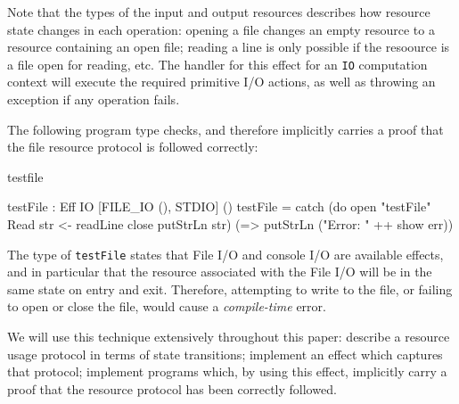 \noindent
Note that the types of the input and output resources describes how resource
state changes in each operation: opening a file changes an empty resource to
a resource containing an open file; reading a line is only possible if the
resoource is a file open for reading, etc.
The handler for this effect for an \texttt{IO} computation context will
execute the required primitive I/O actions, as well as throwing an exception
if any operation fails.

The following program type checks, and therefore implicitly carries 
a proof that the file resource protocol is followed correctly:

\begin{SaveVerbatim}{testfile}

testFile : Eff IO [FILE_IO (), STDIO] () 
testFile = catch (do open "testFile" Read
                     str <- readLine
                     close
                     putStrLn str)
            (\err => putStrLn ("Error: " ++ show err))

\end{SaveVerbatim}

\noindent
The type of \texttt{testFile} states
that File I/O and console I/O are available effects, and in particular that
the resource associated with the File I/O will be in the same state on entry
and exit.
Therefore, attempting to write to the file, or failing to open or close the
file, would cause a \emph{compile-time} error. 

We will use this technique extensively
throughout this paper: describe a resource usage protocol in terms of
state transitions; implement an effect which captures that protocol; implement
programs which, by using this effect, implicitly carry a proof that the resource
protocol has been correctly followed.



